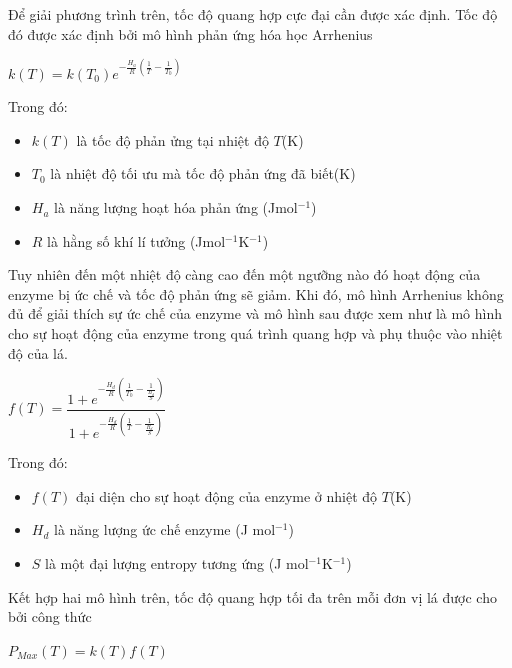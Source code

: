 \documentclass[a4paper]{article}
\begin{document}
    Để giải phương trình trên, tốc độ quang hợp cực đại cần được xác định. Tốc độ đó được xác định bởi mô hình phản ứng hóa học Arrhenius
    \begin{center}
        $k(T) = k(T_0)e^{-\frac{H_a}{R}\left(\frac{1}{T} - \frac{1}{T_0}\right)}$
    \end{center}
    Trong đó:
    \begin{itemize}
        \item $k(T)$ là tốc độ phản ửng tại nhiệt độ $T$(K)
        \item $T_0$ là nhiệt độ tối ưu mà tốc độ phản ứng đã biết(K)
        \item $H_a$ là năng lượng hoạt hóa phản ứng (J\;mol$^{-1}$)
        \item $R$ là hằng số khí lí tưởng (J\;mol$^{-1}$K$^{-1}$)
    \end{itemize}
    Tuy nhiên đến một nhiệt độ càng cao đến một ngưỡng nào đó hoạt động của enzyme bị ức chế và tốc độ phản ứng sẽ giảm. Khi đó, mô hình Arrhenius không đủ để giải thích sự ức chế của enzyme và mô hình sau được xem như là mô hình cho sự hoạt động của enzyme trong quá trình quang hợp và phụ thuộc vào nhiệt độ của lá.
    \begin{center}
        $f(T) = \dfrac{1 + e^{-\frac{H_d}{R}\left(\frac{1}{T_0} - \frac{1}{\frac{H_d}{S}}\right)}}{1 + e^{-\frac{H_d}{R}\left(\frac{1}{T} - \frac{1}{\frac{H_d}{S}}\right)}}$
    \end{center}
    Trong đó:
    \begin{itemize}
        \item $f(T)$ đại diện cho sự hoạt động của enzyme ở nhiệt độ $T$(K) 
        \item $H_d$ là năng lượng ức chế enzyme (J mol$^{-1}$)
        \item $S$ là một đại lượng entropy tương ứng (J mol$^{-1}$K$^{-1}$)
    \end{itemize}
    Kết hợp hai mô hình trên, tốc độ quang hợp tối đa trên mỗi đơn vị lá được cho bởi công thức
    \begin{center}
        $P_{Max}(T) = k(T)f(T)$
    \end{center}
    
    \vspace{5mm}
    
\end{document}
